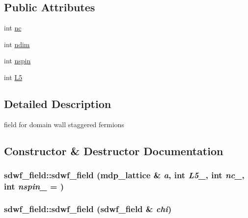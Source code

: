 \subsection*{Public Attributes}
\begin{DoxyCompactItemize}
\item 
int \hyperlink{classsdwf__field_a957d5e1caa928243ec4224cf1e2861f1}{nc}
\item 
int \hyperlink{classsdwf__field_a5a861ccb2b42b333b5d67e3b501e8533}{ndim}
\item 
int \hyperlink{classsdwf__field_a6269e653489fd6ee9340da498187b132}{nspin}
\item 
int \hyperlink{classsdwf__field_a19bd0e3027574c1204f8aa3f6635d1df}{L5}
\end{DoxyCompactItemize}


\subsection{Detailed Description}
field for domain wall staggered fermions 

\subsection{Constructor \& Destructor Documentation}
\hypertarget{classsdwf__field_a904cdf6c1f542aa5d4873b5c049a0de5}{
\subsubsection[{sdwf\_\-field}]{\setlength{\rightskip}{0pt plus 5cm}sdwf\_\-field::sdwf\_\-field ({\bf mdp\_\-lattice} \& {\em a}, \/  int {\em L5\_\-}, \/  int {\em nc\_\-}, \/  int {\em nspin\_\-} = {})}}
\label{classsdwf__field_a904cdf6c1f542aa5d4873b5c049a0de5}
\hypertarget{classsdwf__field_af1438250ba08d632c4906ef99ad907ea}{
\subsubsection[{sdwf\_\-field}]{\setlength{\rightskip}{0pt plus 5cm}sdwf\_\-field::sdwf\_\-field ({\bf sdwf\_\-field} \& {\em chi})}}
\label{classsdwf__field_af1438250ba08d632c4906ef99ad907ea}


